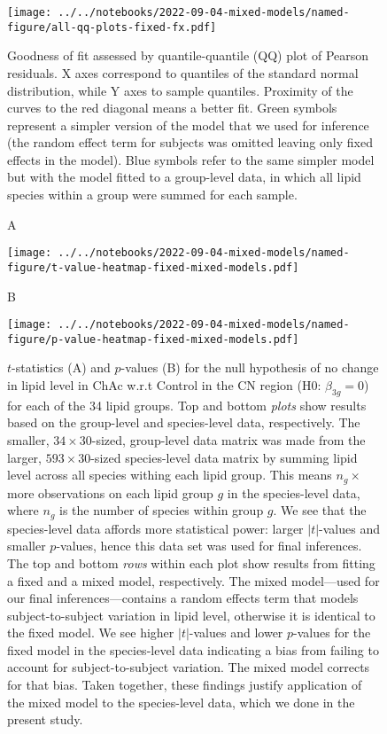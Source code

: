 \documentclass[letterpaper]{article}
\begin{document}
\begin{figure}[p]
	\texttt{[image: ../../notebooks/2022-09-04-mixed-models/named-figure/all-qq-plots-fixed-fx.pdf]}
	\caption[Goodness of fit: normality of residuals]{
	Goodness of fit assessed by quantile-quantile (QQ) plot of Pearson
	residuals. X axes correspond to quantiles of the standard normal
	distribution, while Y axes to sample quantiles. Proximity of the curves to
	the red diagonal means a better fit. Green symbols represent a simpler
	version of the model that we used for inference (the random effect term for
	subjects was omitted leaving only fixed effects in the model). Blue symbols
	refer to the same simpler model but with the model fitted to a group-level
	data, in which all lipid species within a group were summed for each sample.
}
\label{fig:QQ-plots}
\end{figure}

\begin{figure}[p]
	A

	\texttt{[image: ../../notebooks/2022-09-04-mixed-models/named-figure/t-value-heatmap-fixed-mixed-models.pdf]}

	B

	\texttt{[image: ../../notebooks/2022-09-04-mixed-models/named-figure/p-value-heatmap-fixed-mixed-models.pdf]}
	\caption[Comparing models and datasets in terms of $t$-statistics and
	$p$-values]{
	$t$-statistics (A) and $p$-values (B) for the null hypothesis of no change
	in lipid level in ChAc w.r.t Control in the CN region (H0: $\beta_{3g}=0$)
	for each of the 34 lipid groups.  Top and bottom \emph{plots} show results
	based on the group-level and species-level data, respectively.  The smaller,
	$34 \times 30$-sized, group-level data matrix was made from the larger, $593
	\times 30$-sized species-level data matrix by summing lipid level across all
	species withing each lipid group.  This means $n_g\times$ more observations
	on each lipid group $g$ in the species-level data, where $n_g$ is the number
	of species within group $g$.  We see that the species-level data affords
	more statistical power: larger $|t|$-values and smaller $p$-values, hence
	this data set was used for final inferences.  The top and bottom \emph{rows}
	within each plot show results from fitting a fixed and a mixed model,
	respectively.  The mixed model---used for our final inferences---contains a
	random effects term that models subject-to-subject variation in lipid level,
	otherwise it is identical to the fixed model.  We see higher $|t|$-values
	and lower $p$-values for the fixed model in the species-level data
	indicating a bias from failing to account for subject-to-subject variation.
	The mixed model corrects for that bias.  Taken together, these findings
	justify application of the mixed model to the species-level data, which we
	done in the present study.
}
\label{fig:t-value-heatmap}
\end{figure}
\end{document}
